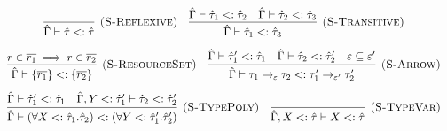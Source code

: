 \documentclass{llncs}
\begin{document}
\[
\begin{array}{c}


\infer[\textsc{(S-Reflexive)}]
	{\hat \Gamma \vdash \hat \tau <: \hat \tau}
	{}
~~~
\infer[\textsc{(S-Transitive)}]
	{\hat \Gamma \vdash \hat \tau_1 <: \hat \tau_3}
	{\hat \Gamma \vdash \hat \tau_1 <: \hat \tau_2 & \hat \Gamma \vdash \hat \tau_2 <: \hat \tau_3} \\[2ex]

\infer[\textsc{(S-ResourceSet)}]
	{\hat \Gamma \vdash \{ \overline{r_1} \} <: \{ \overline{r_2} \}}
	{r \in \overline{r_1} \implies r \in \overline{r_2}}
~~~
\infer[\textsc{(S-Arrow)}]
	{\hat \Gamma \vdash \tau_1 \rightarrow_{\varepsilon} \tau_2 <: \tau_1' \rightarrow_{\varepsilon'} \tau_2'}
	{\hat \Gamma \vdash \hat \tau_1' <: \hat \tau_1 & \hat \Gamma \vdash \hat \tau_2 <: \hat \tau_2' & \varepsilon \subseteq \varepsilon'} \\[2ex]

\infer[\textsc{(S-TypePoly)}]
	{\hat \Gamma \vdash (\forall X <: \hat \tau_1 . \hat \tau_2) <: (\forall Y <: \hat \tau_1' . \hat \tau_2')}
	{\hat \Gamma \vdash \hat \tau_1' <: \hat \tau_1 & \hat \Gamma, Y <: \hat \tau_1' \vdash \hat \tau_2 <: \hat \tau_2'}
~~~
\infer[\textsc{(S-TypeVar)}]
	{\hat \Gamma, X <: \hat \tau \vdash X <: \hat \tau}
	{}                                                                                                                                                                                                                                                                                                                                                                                                                                                                                                                                                                                                                                                                                                                                                                                                                                                                                                                                                                                                                                                                                                                                                                                                                                                                                                                                                                                                                                                                                                                                                                                                                                                                                                                    

\end{array}
\]
\end{document}
